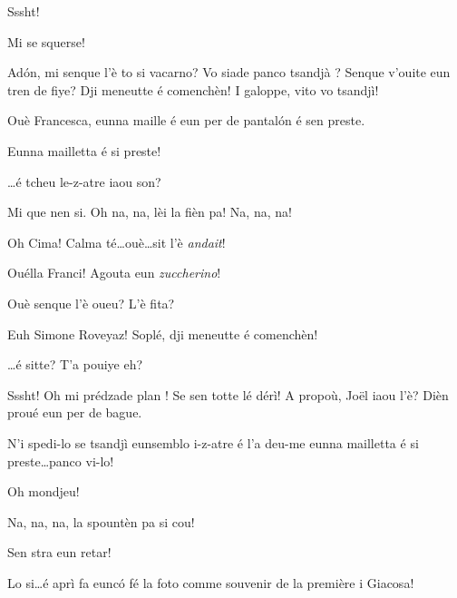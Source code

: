 \begin{drama}
\Pierrespeaks Sssht!

\Joelspeaks Mi se squerse!


\Francescaspeaks Ad\'on, mi senque l'è to si vacarno? Vo siade panco tsandjà \disperazione ? Senque v'ouite eun tren de fiye? Dji meneutte é comenchèn! I galoppe, vito vo tsandjì!

\Marcospeaks Ouè Francesca, eunna maille é eun per de pantal\'on é sen preste.

\Joelspeaks Eunna mailletta é si preste!


\Francescaspeaks \ldots é tcheu le-z-atre iaou son?

\Cimaspeaks Mi que nen si. Oh na, na, lèi la fièn pa! Na, na, na!

\Francescaspeaks Oh Cima! Calma té\ldots ouè\ldots sit l'è \textit{andait}! 


\Simonespeaks{} Ouélla Franci! Agouta eun \textit{zuccherino}!


\Cimaspeaks{} Ouè senque l'è oueu? L'è fita?

\Francescaspeaks Euh Simone Roveyaz! Soplé, dji meneutte é comenchèn!

\Simonespeaks{} \ldots é sitte? T'a pouiye eh?



\Joellespeaks Sssht! Oh mi prédzade plan 	\quei ! Se sen totte lé dérì!   A propoù, Jo\"{e}l iaou l'è? Dièn proué eun per de bague.

\Francescaspeaks N'i spedi-lo se tsandjì eunsemblo i-z-atre é l'a deu-me \og eunna mailletta é si preste\fg \ldots panco vi-lo!

\Joellespeaks Oh mondjeu!

\Cimaspeaks{} Na, na, na, la spountèn pa si cou!

\Francescaspeaks Sen stra eun retar!

\Joellespeaks Lo si\ldots é aprì fa eunc\'o fé la foto comme souvenir de la première i Giacosa!


\end{drama}
